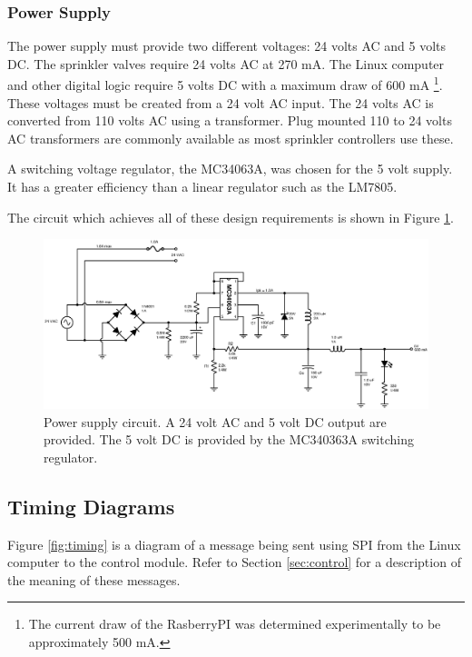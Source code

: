 \documentclass{article}
\begin{document}

\subsubsection{Power Supply}
\label{sec:power}

The power supply must provide two different voltages: 24 volts AC and
5 volts DC.
The sprinkler valves require 24 volts AC at 270 mA.
The Linux computer and other digital logic require 5 volts DC with a
maximum draw of 600 mA
\footnote{The current draw of the RasberryPI was determined
experimentally to be approximately 500 mA.}.
These voltages must be created from a 24 volt AC input.
The 24 volts AC is converted from 110 volts AC using a transformer.
Plug mounted 110 to 24 volts AC transformers are commonly available
as most sprinkler controllers use these.

A switching voltage regulator, the MC34063A, was chosen for
the 5 volt supply.
It has a greater efficiency than a linear regulator such as
the LM7805.

The circuit which achieves all of these design requirements is
shown in Figure \ref{fig:power}.

\begin{figure}[hbp]
\centering
\includegraphics[angle=90,scale=0.70]{xcircuit/power_supply}
\caption{Power supply circuit. A 24 volt AC and 5 volt DC output are
provided.  The 5 volt DC is provided by the MC340363A switching
regulator.}\label{fig:power}
\end{figure}



\FloatBarrier
\subsection{Timing Diagrams}

Figure \ref{fig:timing} is a diagram of a message being sent
using SPI from the Linux computer to the control module.
Refer to Section \ref{sec:control} for a description of
the meaning of these messages.
\end{document}
